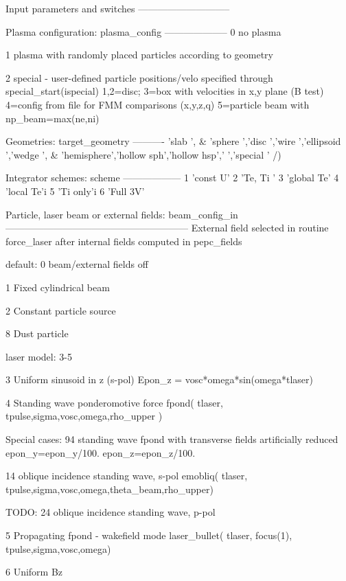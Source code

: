 
Input parameters and switches
-----------------------------

Plasma configuration:  plasma_config
--------------------
 0   no plasma
 
 1   plasma with randomly placed particles according to geometry

 2    special  - user-defined particle positions/velo specified through 
    special_start(ispecial)
                1,2=disc;
	        3=box with velocities in x,y plane (B test)
		4=config from file for FMM comparisons (x,y,z,q)
		5=particle beam with np_beam=max(ne,ni)

Geometries:  target_geometry
----------
       'slab      ', &
       'sphere    ','disc      ','wire      ','ellipsoid ','wedge     ', &
       'hemisphere','hollow sph','hollow hsp','          ','special   ' /)

Integrator schemes:  scheme
------------------
 1 'const U'
 2 'Te, Ti '
 3 'global Te'
 4  'local  Te'i
 5  'Ti only'i
 6  'Full 3V' 


Particle, laser beam or external fields:   beam_config_in
---------------------------------------------------------
  External field selected in routine force_laser
  after internal fields computed in pepc_fields

 default:  
 0	 beam/external fields off

 1    Fixed cylindrical beam

 2    Constant particle source

 8    Dust particle

 laser model: 3-5

 3   Uniform sinusoid in z (s-pol)
       Epon_z = vosc*omega*sin(omega*tlaser)

 4   Standing wave ponderomotive force
        fpond( tlaser, tpulse,sigma,vosc,omega,rho_upper )

     Special cases:
  	94   standing wave fpond with transverse fields artificially reduced
              epon_y=epon_y/100.
              epon_z=epon_z/100.

        14   oblique incidence standing wave, s-pol
             emobliq( tlaser, tpulse,sigma,vosc,omega,theta_beam,rho_upper)

TODO:   24   oblique incidence standing wave, p-pol

 5  Propagating fpond - wakefield mode
        laser_bullet( tlaser, focus(1), tpulse,sigma,vosc,omega)

6   Uniform Bz
